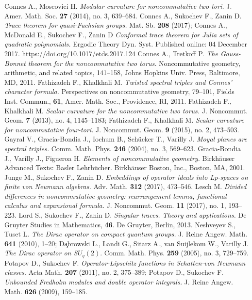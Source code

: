 \documentclass{article}
\begin{document}
\begin{thebibliography}{99}
 Connes A., Moscovici H. {\it Modular curvature for noncommutative two-tori.} J. Amer. Math. Soc. {\bf 27} (2014), no. 3, 639--684.
 Connes A., Sukochev F., Zanin D. {\it Trace theorem for quasi-Fuchsian groups.} Mat. Sb. {\bf 208} (2017); Connes A., McDonald E., Sukochev F., Zanin D {\it Conformal trace theorem for Julia sets of quadratic polynomials.} Ergodic Theory Dyn. Syst. Published online: 04 December 2017. https://doi.org/10.1017/etds.2017.124
 Connes A., Tretkoff P. {\it The Gauss-Bonnet theorem for the noncommutative two torus.} Noncommutative geometry, arithmetic, and related topics, 141--158, Johns Hopkins Univ. Press, Baltimore, MD, 2011.
 Fathizadeh F., Khalkhali M. {\it Twisted spectral triples and Connes' character formula.} Perspectives on noncommutative geometry, 79--101, Fields Inst. Commun., {\bf 61}, Amer. Math. Soc., Providence, RI, 2011.
 Fathizadeh F., Khalkhali M. {\it Scalar curvature for the noncommutative two torus.} J. Noncommut. Geom. {\bf 7} (2013), no. 4, 1145--1183; Fathizadeh F., Khalkhali M. {\it Scalar curvature for noncommutative four-tori.} J. Noncommut. Geom. {\bf 9} (2015), no. 2, 473--503.
 Gayral V., Gracia-Bondia J., Iochum B., Sch\"ucker T., Varilly J. {\it Moyal planes are spectral triples.} Comm. Math. Phys. {\bf 246} (2004), no. 3, 569--623.
 Gracia-Bondia J., Varilly J., Figueroa H. {\it Elements of noncommutative geometry.} Birkh\"auser Advanced Texts: Basler Lehrb\"ucher. Birkh\"auser Boston, Inc., Boston, MA, 2001.
 Junge M., Sukochev F., Zanin D. {\it Embeddings of operator ideals into Lp-spaces on finite von Neumann algebras.} Adv. Math. {\bf 312} (2017), 473--546.
 Lesch M. {\it Divided differences in noncommutative geometry: rearrangement lemma, functional calculus and expansional formula.} J. Noncommut. Geom. {\bf 11} (2017), no. 1, 193--223.
 Lord S., Sukochev F., Zanin D. {\it Singular traces. Theory and applications.} De Gruyter Studies in Mathematics, {\bf 46}. De Gruyter, Berlin, 2013.
 Neshveyev S., Tuset L. {\it The Dirac operator on compact quantum groups.} J. Reine Angew. Math. {\bf 641} (2010), 1--20; Da̧browski L., Landi G., Sitarz A., van Suijlekom W., Varilly J. {\it The Dirac operator on $SU_q(2).$} Comm. Math. Phys. {\bf 259} (2005), no. 3, 729--759.
 Potapov D., Sukochev F. {\it Operator-Lipschitz functions in Schatten-von Neumann classes.} Acta Math. {\bf 207} (2011), no. 2, 375--389; Potapov D., Sukochev F. {\it Unbounded Fredholm modules and double operator integrals.} J. Reine Angew. Math. {\bf 626} (2009), 159--185.

\end{thebibliography}
\end{document}
